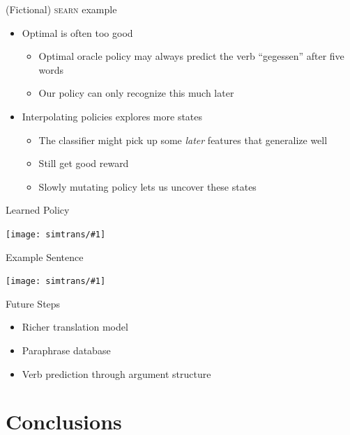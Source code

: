\documentclass[compress]{beamer}
\newcommand{\gfxs}[2]{
\begin{center}
	\texttt{[image: simtrans/\#1]}
\end{center}
}
\begin{document}
\begin{frame}{(Fictional) \textsc{searn} example}

  \begin{itemize}
    \item Optimal is often too good
      \begin{itemize}
        \item Optimal oracle policy may always predict the verb
      ``gegessen'' after five words
        \item Our policy can only recognize this much later
       \end{itemize}
       \item Interpolating policies explores more states
         \begin{itemize}
           \item The classifier might pick up some \emph{later}
             features that generalize well
           \item Still get good reward
           \item Slowly mutating policy lets us uncover these states
         \end{itemize}
  \end{itemize}

\end{frame}

\begin{frame}{Learned Policy}

  \gfxs{learned_policy}{.8}

\end{frame}

\begin{frame}{Example Sentence}

  \gfxs{ex_imperfect}{.7}

\end{frame}

\begin{frame}{Future Steps}

  \begin{itemize}
    \item Richer translation model
    \item Paraphrase database
    \item Verb prediction through argument structure
  \end{itemize}

\end{frame}

\section{Conclusions}
\end{document}
